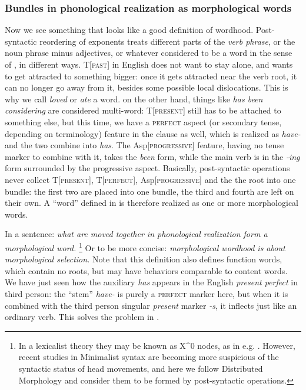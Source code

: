 \documentclass[a4paper, oneside, scheme=plain, 12pt]{article}
\newcommand*{\term}[1]{\emph{#1}}
\newcommand{\form}[1]{\emph{#1}}
\newcommand*{\category}[1]{\textsc{#1}}
\begin{document}
\subsubsection{Bundles in phonological realization as morphological words}\label{sec:morphological-wordhood-production}

Now we see something that looks like a good definition of wordhood.
Post-syntactic reordering of exponents treats different parts of the \term{verb phrase},
or the noun phrase minus adjectives, or whatever considered to be a word in the sense of , in different ways.
T[\category{past}] in English does not want to stay alone,
and wants to get attracted to something bigger:
once it gets attracted near the verb root,
it can no longer go away from it, besides some possible local dislocations.
This is why we call \form{loved} or \form{ate} a word.
on the other hand, things like \form{has been considering} are considered multi-word:
T[\category{present}] still has to be attached to something else,
but this time, we have a \category{perfect} aspect (or secondary tense, depending on terminology) feature in the clause as well,
which is realized as \form{have-} and the two combine into \form{has}.
The Asp[\category{progressive}] feature, having no tense marker to combine with it,
takes the \form{been} form, while the main verb is in the \form{-ing} form surrounded by the progressive aspect.
Basically, post-syntactic operations never collect T[\category{present}], T[\category{perfect}], Asp[\category{progressive}] and the the root into one bundle:
the first two are placed into one bundle, the third and fourth are left on their own.
A ``word'' defined in 
is therefore realized as one or more morphological words.

In a sentence: \form{what are moved together in phonological realization form a morphological word.}%
\footnote{
    In a lexicalist theory they may be known as X^0 nodes, as in e.g. \citet{bickel2007free}.
    However, recent studies in Minimalist syntax are becoming more suspicious
    of the syntactic status of head movements,
    and here we follow Distributed Morphology and consider them to be formed by 
    post-syntactic operations.
}
Or to be more concise: \form{morphological wordhood is about morphological selection.}
Note that this definition also defines function words,
which contain no roots, but may have behaviors comparable to content words.
We have just seen how the auxiliary \form{has} appears in the English \form{present perfect} in third person:
the ``stem'' \form{have-} is purely a \category{perfect} marker here,
but when it is combined with the third person singular \form{present} marker \form{-s},
it inflects just like an ordinary verb.
This solves the problem in .
\end{document}
